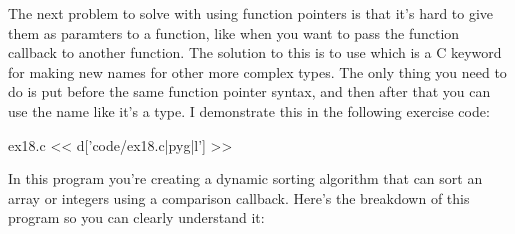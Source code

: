 The next problem to solve with using function pointers is that it's hard to
give them as paramters to a function, like when you want to pass the function
callback to another function.  The solution to this is to use 
which is a C keyword for making new names for other more complex types.
The only thing you need to do is put  before the same 
function pointer syntax, and then after that you can use the name like
it's a type.  I demonstrate this in the following exercise code:

\begin{code}{ex18.c}
<< d['code/ex18.c|pyg|l'] >>
\end{code}

In this program you're creating a dynamic sorting algorithm that can sort
an array or integers using a comparison callback.  Here's the breakdown
of this program so you can clearly understand it:

